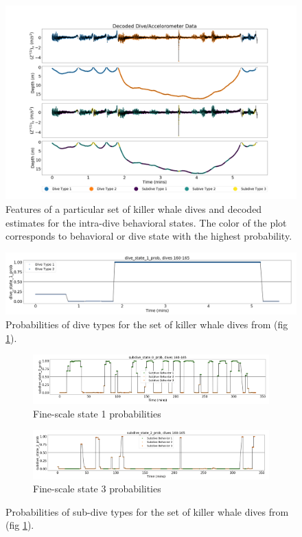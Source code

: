 
\begin{figure}[ht]
	\centering
	\includegraphics[width=5in]{../Plots/decoded_data.png}
	\caption{Features of a particular set of killer whale dives and decoded estimates for the intra-dive behavioral states. The color of the plot corresponds to behavioral or dive state with the highest probability.}
	\label{fig:labeled_dives}
\end{figure}
%
\begin{figure}[ht]
	\centering
	\includegraphics[width=5in]{../Plots/Coarse_state_probs.png}
	\caption{Probabilities of dive types for the set of killer whale dives from (fig \ref{fig:labeled_dives}).}
	\label{fig:coarse_probs}
\end{figure}
%
\begin{figure}[ht]
	\centering
	\begin{subfigure}[t]{1.0\textwidth}
        \centering
        \includegraphics[width=5in]{../Plots/Fine_state_probs_1.png}
        \caption{Fine-scale state 1 probabilities}
    \end{subfigure}
    \newline
    \begin{subfigure}[t]{1.0\textwidth}
        \centering
        \includegraphics[width=5in]{../Plots/Fine_state_probs_3.png}
        \caption{Fine-scale state 3 probabilities}
    \end{subfigure}
	\caption{Probabilities of sub-dive types for the set of killer whale dives from (fig \ref{fig:labeled_dives}).}
	\label{fig:fine_probs}
\end{figure}


